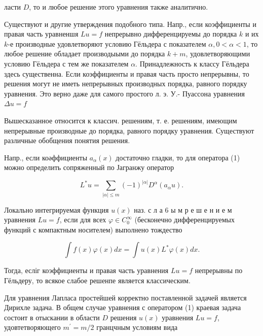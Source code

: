 \documentclass[10pt]{article}
\begin{document}
ласти $D$, то и любое решение этого уравнения также аналитично.



Существуют и другие утверждения подобного типа. Напр., если коэффициенты и правая часть уравненшя $L u=f$ непрерывно дифференцируемы до порядка $k$ и их $k$-е производные удовлетворяют условию Гёльдера с показателем $\alpha, 0<\alpha<1$, то любое решение обладает производыыми до порядка $k+m$, удовлетворяющими условию Гёльдера с тем же показателем $\alpha$. Принадлежность к классу Гёльдера здесь существенна. Если коэффициенты и правая часть просто непрерывны, то решения могут не иметь непрерывных производных порядка, равного порядку уравнения. Это верно даже для самого простого л. э. У.- Пуассона уравнения $\Delta u=f$



Вышесказанное относится к классич. решениям, т. е. решениям, имеющим непрерывные производные до порядка, равного порядку уравнения. Существуют различные обобщения понятия решения.



Напр., если коәффициенты $a_{\alpha}(x)$ достаточно гладки, то для оператора (1) можно определить сопряженный по Јагранжу оператор



\[

L^{*} u=\sum_{|\alpha| \leqslant m}(-1)^{|\alpha|} D^{\alpha}\left(a_{\alpha} u\right) .

\]



Локально интегрируемая функция $u(x)$ наз. с л а 6 ы м р е ш е н и е м уравнения $L u=f$, если для всех $\varphi \in C_{0}^{\infty}$ (бесконечно дифференцируемых функций с компактным носителем) выполнено тождество



\[

\int f(x) \varphi(x) d x=\int u(x) L^{*} \varphi(x) d x .

\]



Тогда, есліг коэффициенты и правая часть уравнения $L u=f$ непрерывны по Гёльдеру, то всякое слабое решенпе является классическим.



Для уравнения Лапласа простейшей корректно поставленной задачей является Дирихле задача. В общем случае уравнения с оператором (1) краевая задача состоит в отыскании в области $D$ решения $u(x)$ уравнения $L u=f$, удовтетворяющего $m^{\prime}=m / 2$ гранцчным условиям вида
\end{document}
